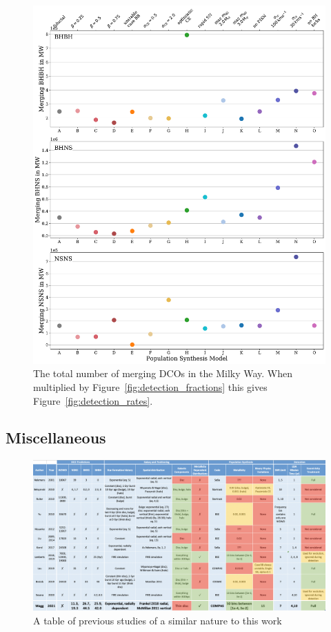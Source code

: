 \documentclass[twocolumn]{aastex63}
\begin{document}
\begin{figure}[p]
    \centering
    \includegraphics[width=\textwidth]{dco_merging.pdf}
    \caption{The total number of merging DCOs in the Milky Way. When multiplied by Figure~\ref{fig:detection_fractions} this gives Figure~\ref{fig:detection_rates}.}
    \label{fig:total_merging_dcos}
\end{figure}

\subsection{Miscellaneous}

\begin{figure}[p]
    \centering
    \includegraphics[height=0.95\textheight]{previous_studies.png}
    \caption{A table of previous studies of a similar nature to this work}
    \label{fig:previous_studies}
\end{figure}
\end{document}
